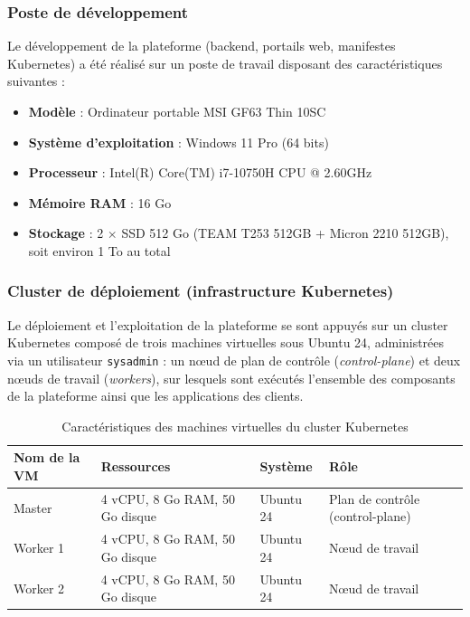     \subsubsection{Poste de développement}

    Le développement de la plateforme (backend, portails web, manifestes Kubernetes) a été réalisé sur un poste de travail disposant des caractéristiques suivantes :

    \begin{itemize}
        \item \textbf{Modèle} : Ordinateur portable MSI GF63 Thin 10SC
        \item \textbf{Système d'exploitation} : Windows 11 Pro (64 bits)
        \item \textbf{Processeur} : Intel(R) Core(TM) i7-10750H CPU @ 2.60GHz
        \item \textbf{Mémoire RAM} : 16 Go
        \item \textbf{Stockage} : 2 $\times$ SSD 512 Go (TEAM T253 512GB + Micron 2210 512GB), soit environ 1 To au total
    \end{itemize}

    \subsubsection{Cluster de déploiement (infrastructure Kubernetes)}

    Le déploiement et l'exploitation de la plateforme se sont appuyés sur un cluster Kubernetes composé de trois machines virtuelles sous Ubuntu 24, administrées via un utilisateur \texttt{sysadmin} : un nœud de plan de contrôle (\textit{control-plane}) et deux nœuds de travail (\textit{workers}), sur lesquels sont exécutés l'ensemble des composants de la plateforme ainsi que les applications des clients.

    \begin{table}[H]
    \begin{center}
    \begin{tabular}{|l{3cm}|l{4cm}|l{3cm}|l{3cm}|}
    \hline
    \textbf{Nom de la VM} & \textbf{Ressources} & \textbf{Système} & \textbf{Rôle} \\
    \hline
    Master   & 4 vCPU, 8 Go RAM, 50 Go disque & Ubuntu 24 & Plan de contrôle (control-plane) \\
    \hline
    Worker 1 & 4 vCPU, 8 Go RAM, 50 Go disque & Ubuntu 24 & Nœud de travail \\
    \hline
    Worker 2 & 4 vCPU, 8 Go RAM, 50 Go disque & Ubuntu 24 & Nœud de travail \\
    \hline
    \end{tabular}
    \caption{Caractéristiques des machines virtuelles du cluster Kubernetes}
    \label{tab:vms-cluster}
    \end{center}
    \end{table}

